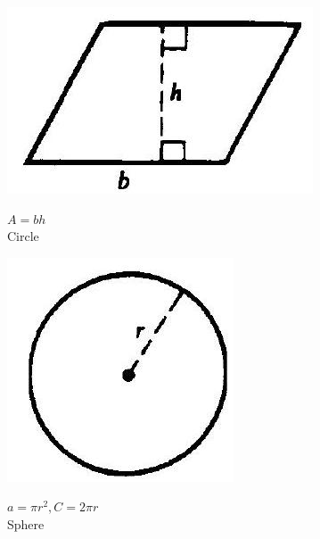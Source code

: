 \documentclass[10pt]{article}
\begin{document}
\begin{center}
\includegraphics[max width=\textwidth]{2024_04_20_fe2e8e718cc0fcd63d1bg-30(2)}
\end{center}

$A=b h$\\
Circle

\begin{center}
\includegraphics[max width=\textwidth]{2024_04_20_fe2e8e718cc0fcd63d1bg-30(5)}
\end{center}

$a=\pi r^{2}, C=2 \pi r$\\
Sphere
\end{document}
